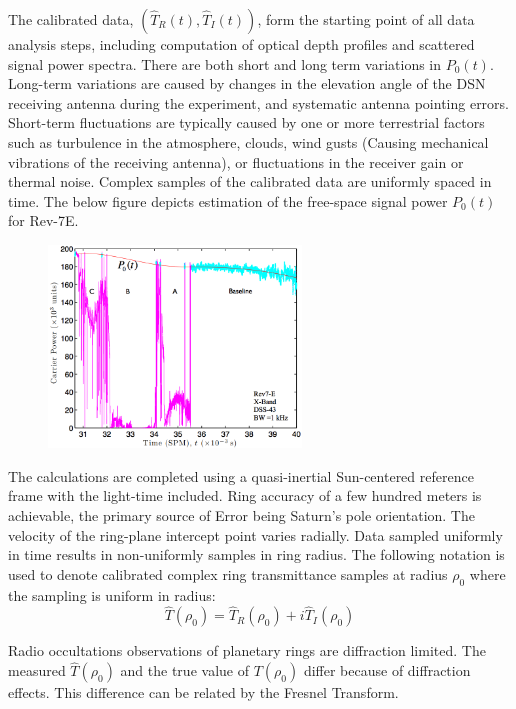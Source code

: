 \documentclass[oneside]{book}
\theoremstyle{mystyle}
\begin{document}
\noindent The calibrated data, $(\hat{T}_{R}(t),\hat{T}_{I}(t))$, form the starting point of all data analysis steps, including computation of optical depth profiles and scattered signal power spectra. There are both short and long term variations in $P_{0}(t)$. Long-term variations are caused by changes in the elevation angle of the DSN receiving antenna during the experiment, and systematic antenna pointing errors. Short-term fluctuations are typically caused by one or more terrestrial factors such as turbulence in the atmosphere, clouds, wind gusts (Causing mechanical vibrations of the receiving antenna), or fluctuations in the receiver gain or thermal noise. Complex samples of the calibrated data are uniformly spaced in time. The below figure depicts estimation of the free-space signal power $P_0(t)$ for Rev-7E.
\begin{figure}[htbp]
	\centering
	\includegraphics[width = 0.6\textwidth]{USER_9}
\end{figure}
The calculations are completed using a quasi-inertial Sun-centered reference frame with the light-time included. Ring accuracy of a few hundred meters is achievable, the primary source of Error being Saturn's pole orientation. The velocity of the ring-plane intercept point varies radially. Data sampled uniformly in time results in non-uniformly samples in ring radius. The following notation is used to denote calibrated complex ring transmittance samples at radius $\rho_0$ where the sampling is uniform in radius:
\begin{equation}
\hat{T}(\rho_0) = \hat{T}_{R}(\rho_0)+i\hat{T}_{I}(\rho_0)
\end{equation}

\noindent Radio occultations observations of planetary rings are diffraction limited. The measured $\hat{T}(\rho_0)$ and the true value of $T(\rho_0)$ differ because of diffraction effects. This difference can be related by the Fresnel Transform.
\end{document}
